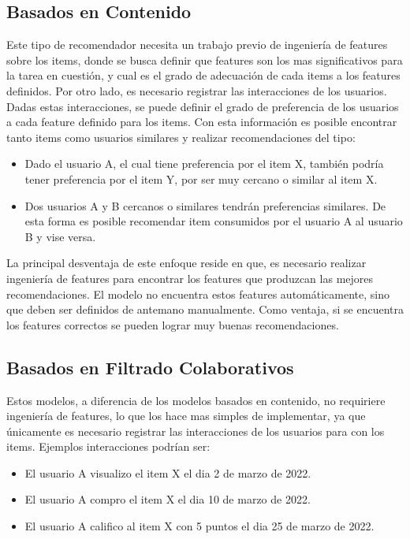 \documentclass[11pt,a4paper,twoside]{thesis}
\begin{document}
\subsection{Basados en Contenido}

Este tipo de recomendador necesita un trabajo previo de ingeniería de features sobre los items, donde se busca definir que features son los mas significativos para la tarea en cuestión, y cual es el grado de adecuación de cada items a los features definidos. Por otro lado, es necesario registrar las interacciones de los usuarios. Dadas estas interacciones, se puede definir el grado de preferencia de los usuarios a cada feature definido para los items. Con esta información es posible encontrar tanto items como usuarios similares y realizar recomendaciones del tipo:

\begin{itemize}
\item Dado el usuario A, el cual tiene preferencia por el item X, también podría tener preferencia por el item Y, por ser muy cercano o similar al item X.
\item Dos usuarios A y B cercanos o similares tendrán preferencias similares. De esta forma es posible recomendar item consumidos por el usuario A al usuario B y vise versa. 
\end{itemize}
	
La principal desventaja de este enfoque reside en que, es necesario realizar ingeniería de features para encontrar los features que produzcan las mejores recomendaciones. El modelo no encuentra estos features automáticamente, sino que deben ser definidos de antemano manualmente. Como ventaja, si se encuentra los features correctos se pueden lograr muy buenas recomendaciones.
		
\subsection{Basados en Filtrado Colaborativos} 

Estos modelos, a diferencia de los modelos basados en contenido, no requiriere ingeniería de features, lo que los hace mas simples de implementar, ya que únicamente es necesario registrar las interacciones de los usuarios para con los items. Ejemplos interacciones podrían ser:

\begin{itemize}
	\item El usuario A visualizo el item X el dia 2 de marzo de 2022.
	\item El usuario A compro el item X el dia 10 de marzo de 2022.
	\item El usuario A califico al item X con 5 puntos el dia 25 de marzo de 2022.
\end{itemize}
\end{document}

